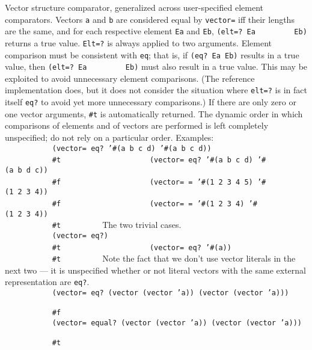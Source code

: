 \begin{entry}{%
  }

  Vector structure comparator, generalized across user-specified
  element comparators. Vectors \texttt{a} and \texttt{b} are
  considered equal by \texttt{vector=} iff their lengths are the same,
  and for each respective element \texttt{Ea} and \texttt{Eb},
  \texttt{(elt=?~Ea~~~~~~~~~Eb)} returns a true value.  \texttt{Elt=?}
  is always applied to two arguments. Element comparison must be
  consistent with \texttt{eq}; that is, if \texttt{(eq?~Ea~Eb)}
  results in a true value, then \texttt{(elt=?~Ea~~~~~~~~~Eb)} must
  also result in a true value. This may be exploited to avoid
  unnecessary element comparisons. (The reference implementation does,
  but it does not consider the situation where \texttt{elt=?} is in
  fact itself \texttt{eq?} to avoid yet more unnecessary comparisons.)
  If there are only zero or one vector arguments, \texttt{\#t} is
  automatically returned. The dynamic order in which comparisons of
  elements and of vectors are performed is left completely
  unspecified; do not rely on a particular order.  Examples:
  \texttt{~~~~~~~~~~~(vector=~eq?~'\#(a~b~c~d)~'\#(a~b~c~d))~~~~~~~~~}\\
  \texttt{~~~~~~~~~~~\#t~~~~~~~~~}
  \texttt{~~~~~~~~~~~(vector=~eq?~'\#(a~b~c~d)~'\#(a~b~d~c))~~~~~~~~~}\\
  \texttt{~~~~~~~~~~~\#f~~~~~~~~~}
  \texttt{~~~~~~~~~~~(vector=~=~'\#(1~2~3~4~5)~'\#(1~2~3~4))~~~~~~~~~}\\
  \texttt{~~~~~~~~~~~\#f~~~~~~~~~}
  \texttt{~~~~~~~~~~~(vector=~=~'\#(1~2~3~4)~'\#(1~2~3~4))~~~~~~~~~}\\
  \texttt{~~~~~~~~~~~\#t~~~~~~~~~} The two trivial cases.
  \texttt{~~~~~~~~~~~(vector=~eq?)~~~~~~~~~}\\
  \texttt{~~~~~~~~~~~\#t~~~~~~~~~}
  \texttt{~~~~~~~~~~~(vector=~eq?~'\#(a))~~~~~~~~~}\\
  \texttt{~~~~~~~~~~~\#t~~~~~~~~~} Note the fact that we don't use
  vector literals in the next two --- it is unspecified whether or not
  literal vectors with the same external representation are
  \texttt{eq?}.
  \texttt{~~~~~~~~~~~(vector=~eq?~(vector~(vector~'a))~(vector~(vector~'a)))~~~~~~~~~}\\
  \texttt{~~~~~~~~~~~\#f~~~~~~~~~}
  \texttt{~~~~~~~~~~~(vector=~equal?~(vector~(vector~'a))~(vector~(vector~'a)))~~~~~~~~~}\\
  \texttt{~~~~~~~~~~~\#t~~~~~~~~~}
\end{entry}

